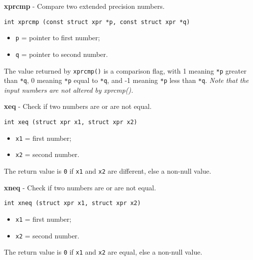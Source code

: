\documentclass{article}
\begin{document}
\hrulefill{}

\textbf{xprcmp} - Compare two extended precision numbers.

\begin{verbatim}
int xprcmp (const struct xpr *p, const struct xpr *q)
\end{verbatim}

\begin{itemize}
\item \texttt{p} = pointer to first number;
\item \texttt{q} = pointer to second number.
\end{itemize}

The value returned by \texttt{xprcmp()} is a comparison flag, with
 1 meaning \texttt{*p} greater than \texttt{*q},  0 meaning \texttt{*p} equal
to \texttt{*q}, and -1 meaning \texttt{*p} less than \texttt{*q}. \textit{Note that}
\textit{the input numbers are not altered by xprcmp().}


\hrulefill{}

\textbf{xeq} - Check if two numbers are or are not equal.

\begin{verbatim}
int xeq (struct xpr x1, struct xpr x2)
\end{verbatim}

\begin{itemize}
\item \texttt{x1} = first number;
\item \texttt{x2} = second number.
\end{itemize}

The return value is \texttt{0} if \texttt{x1} and \texttt{x2} are different, else a
non-null value.


\hrulefill{}

\textbf{xneq} - Check if two numbers are or are not equal.

\begin{verbatim}
int xneq (struct xpr x1, struct xpr x2)
\end{verbatim}

\begin{itemize}
\item \texttt{x1} = first number;
\item \texttt{x2} = second number.
\end{itemize}

The return value is \texttt{0} if \texttt{x1} and \texttt{x2} are equal, else
a non-null value.


\hrulefill{}
\end{document}
